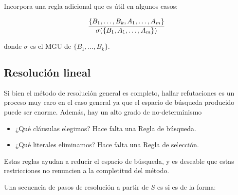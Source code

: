 Incorpora una regla adicional que es útil en algunos casos: 

\[\frac{\{B_1,\dots,B_k,A_1,\dots,A_m\}}{\sigma(\{B_1,A_1,\dots,A_m\})}\]

donde $\sigma$ es el MGU de $\{B_1,\dots,B_k\}$.

\subsection{Resolución lineal}

Si bien el método de resolución general es completo, hallar refutaciones es un proceso muy caro en el caso general ya que el espacio de búsqueda producido puede ser enorme. Además, hay un alto grado de no-determinismo
\begin{itemize}
  \item ¿Qué cláusulas elegimos? Hace falta una Regla de búsqueda.
  \item ¿Qué literales eliminamos? Hace falta una Regla de selección.
\end{itemize}

Estas reglas ayudan a reducir el espacio de búsqueda, y es deseable que estas restricciones no renuncien a la completitud del método.

Una secuencia de pasos de resolución a partir de $S$ es  si es de la forma:

\begin{center}
\end{center}

